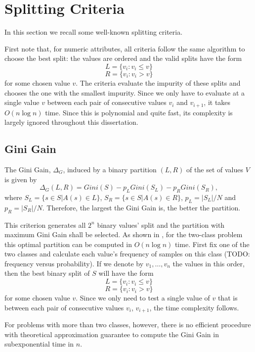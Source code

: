 \section{Splitting Criteria}
In this section we recall some well-known splitting criteria.

First note that, for numeric attributes, all criteria follow the same algorithm to choose the best split: the values are ordered and the valid splits have the form 
$$L = \{v_i : v_i \leq v\}$$
$$R = \{v_i : v_i > v\}$$
for some chosen value $v$. The criteria evaluate the impurity of these splits and chooses the one with the smallest impurity. Since we only have to evaluate at a single value $v$ between each pair of consecutive values $v_i$ and $v_{i+1}$, it takes $O(n \log n)$ time. Since this is polynomial and quite fast, its complexity is largely ignored throughout this dissertation.

\subsection{Gini Gain}

The Gini Gain, $\Delta_G$, induced by a binary partition $(L,R)$ 
of the set of values $V$ is
given by 
\begin{equation}
 \Delta_G (L,R) = Gini(S) -
p_L Gini(S_L) - p_R Gini(S_R),
\label{eq:Ginigain}
\end{equation}
where $S_L= \{ s \in S | A(s) \in L \}$, $S_R= \{ s \in S | A(s) \in R \}$,
 $p_L=|S_L| /N $
and $p_R=|S_R| /N$. Therefore, the largest the Gini Gain is, the better the partition.

This criterion generates all $2^n$ binary values' split and the partition with maximum Gini Gain shall be selected.
As shown in \cite{Breiman84}, for the two-class problem this optimal partition  
can be computed  in $O(n \log n)$ time. First fix one of the two classes and calculate each value's frequency of samples on this class (TODO: frequency versus probability).
If we denote by $v_1,\ldots,v_n$ the values in this order, then the best binary split of $S$ will have the form 
$$L = \{v_i : v_i \leq v\}$$
$$R = \{v_i : v_i > v\}$$
for some chosen value $v$. Since we only need to test a single value of $v$ that is between each pair of consecutive values $v_i$, $v_{i+1}$, the time complexity follows.

For problems with more than two classes, however, there is no efficient procedure with theoretical approximation guarantee to compute the Gini Gain in subexponential time in $n$.

